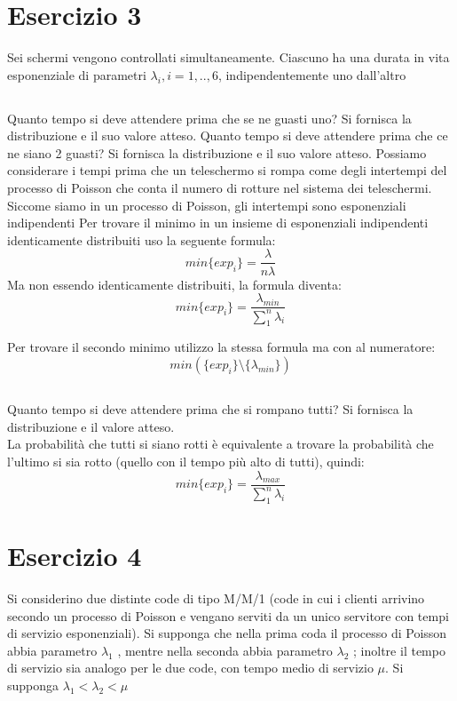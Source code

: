 \documentclass[a4paper]{article}
\begin{document}
\section{Esercizio 3}
Sei schermi vengono controllati simultaneamente. Ciascuno ha una durata in vita esponenziale di parametri $\lambda_i , i = 1, .., 6$, indipendentemente uno dall’altro
\subsection{}
Quanto tempo si deve attendere prima che se ne guasti uno? Si fornisca la distribuzione e il suo valore atteso. Quanto tempo si deve attendere prima che ce ne siano 2 guasti? Si fornisca la distribuzione e il suo valore atteso.
Possiamo considerare i tempi prima che un teleschermo si rompa come degli intertempi del processo di Poisson che conta il numero di rotture nel sistema dei teleschermi.
Siccome siamo in un processo di Poisson, gli intertempi sono esponenziali indipendenti
Per trovare il minimo in un insieme di esponenziali indipendenti identicamente distribuiti uso la seguente formula:
$$min\{exp_i\}= \frac{\lambda}{n \lambda}$$
Ma non essendo identicamente distribuiti, la formula diventa:
$$min\{exp_i\}= \frac{\lambda_{min}}{\sum_1^n \lambda_i}$$

Per trovare il secondo minimo utilizzo la stessa formula ma con al numeratore:  
$$min(\{exp_i\}\setminus \{\lambda_{min}\}) $$
\subsection{}
Quanto tempo si deve attendere prima che si rompano tutti? Si fornisca la distribuzione e il valore atteso.\\

La probabilità che tutti si siano rotti è equivalente a trovare la probabilità che l'ultimo si sia rotto (quello con il tempo più alto di tutti), quindi:
$$min\{exp_i\}= \frac{\lambda_{max}}{\sum_1^n \lambda_i}$$



\section{Esercizio 4}
Si considerino due distinte code di tipo M/M/1 (code in cui i clienti arrivino secondo un processo di Poisson e vengano serviti da un unico servitore con tempi di servizio esponenziali).
Si supponga che nella prima coda il processo di Poisson abbia parametro $\lambda_1$ , mentre nella seconda abbia parametro $\lambda_2$ ; inoltre il tempo di servizio sia analogo per le due code, con tempo medio di servizio $\mu$. Si supponga $\lambda_1 < \lambda_2 < \mu$
\end{document}
